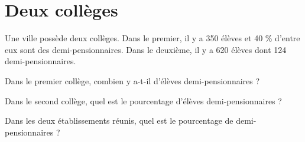 \section{Deux collèges}

Une ville possède deux collèges. 
Dans le premier, il y a 350 élèves et 40 \% d'entre eux sont des demi-pensionnaires. 
Dans le deuxième, il y a 620 élèves dont 124 demi-pensionnaires.

\begin{questions}
	\question Dans le premier collège, combien y a-t-il d'élèves demi-pensionnaires ?
	
	\question Dans le second collège, quel est le pourcentage d'élèves demi-pensionnaires ?
	
	\question Dans les deux établissements réunis, quel est le pourcentage de demi-pensionnaires ?

\end{questions}

